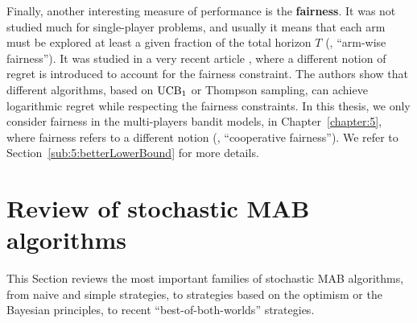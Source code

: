 Finally, another interesting measure of performance is the \textbf{fairness}.
It was not studied much for single-player problems, and usually it means that each arm must be explored at least a given fraction of the total horizon $T$ (\ie, ``arm-wise fairness'').
It was studied in a very recent article \cite{Patil2019stochastic},
where a different notion of regret is introduced to account for the fairness constraint. The authors show that different algorithms, based on $\mathrm{UCB}_1$ or Thompson sampling, can achieve logarithmic regret while respecting the fairness constraints.
%
In this thesis, we only consider fairness in the multi-players bandit models,
in Chapter~\ref{chapter:5}, where fairness refers to a different notion (\ie, ``cooperative fairness'').
We refer to Section~\ref{sub:5:betterLowerBound} for more details.


\section{Review of stochastic MAB algorithms}
\label{sec:2:famousMABalgorithms}

This Section reviews the most important families of stochastic MAB algorithms, from naive and simple strategies, to strategies based on the optimism or the Bayesian principles, to recent ``best-of-both-worlds'' strategies.


